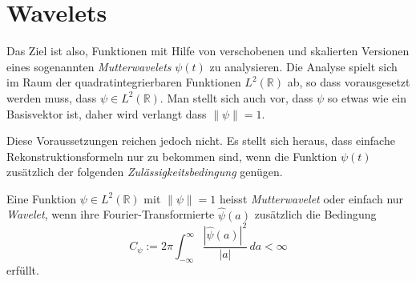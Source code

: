 %
%
%
\section{Wavelets}
Das Ziel ist also, Funktionen mit Hilfe von verschobenen und skalierten
Versionen eines sogenannten {\em Mutterwavelets} $\psi(t)$ zu analysieren.
Die Analyse spielt sich im Raum der quadratintegrierbaren Funktionen
$L^2(\mathbb R)$ ab, so dass vorausgesetzt werden muss,
dass $\psi\in L^2(\mathbb R)$.
Man stellt sich auch vor, dass $\psi$ so etwas wie ein Basisvektor ist,
daher wird verlangt dass $\|\psi\|=1$.

Diese Voraussetzungen reichen jedoch nicht.
Es stellt sich heraus, dass einfache Rekonstruktionsformeln nur zu
bekommen sind, wenn die Funktion $\psi(t)$ zusätzlich der folgenden
{\em Zulässigkeitsbedingung} genügen.
%

\begin{definition}
Eine Funktion $\psi\in L^2(\mathbb R)$ mit $\|\psi\|=1$ heisst 
{\em Mutterwavelet} oder einfach nur {\em Wavelet}, wenn ihre
Fourier-Transformierte $\hat{\psi}(a)$ zusätzlich die Bedingung
\begin{equation}
C_{\psi}
:=
2\pi
\int_{-\infty}^\infty \frac{|\hat{\psi}(a)|^2}{|a|}\,da < \infty
\label{cwt:zulaessig}
\end{equation}
erfüllt.
\end{definition}

